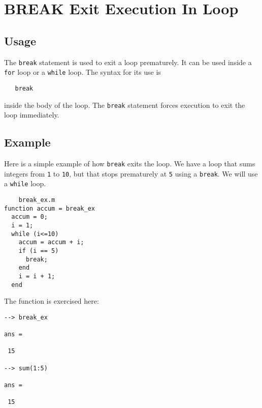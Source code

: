 \section{BREAK Exit Execution In Loop}

\subsection{Usage}

The \verb|break| statement is used to exit a loop prematurely.
It can be used inside a \verb|for| loop or a \verb|while| loop.  The
syntax for its use is
\begin{verbatim}
   break
\end{verbatim}
inside the body of the loop.  The \verb|break| statement forces
execution to exit the loop immediately.
\subsection{Example}

Here is a simple example of how \verb|break| exits the loop.
We have a loop that sums integers from \verb|1| to \verb|10|, but
that stops prematurely at \verb|5| using a \verb|break|.  We will
use a \verb|while| loop.
\begin{verbatim}
    break_ex.m
function accum = break_ex
  accum = 0;
  i = 1;
  while (i<=10) 
    accum = accum + i;
    if (i == 5)
      break;
    end
    i = i + 1;
  end
\end{verbatim}
The function is exercised here:
\begin{verbatim}
--> break_ex

ans = 

 15 

--> sum(1:5)

ans = 

 15 
\end{verbatim}
